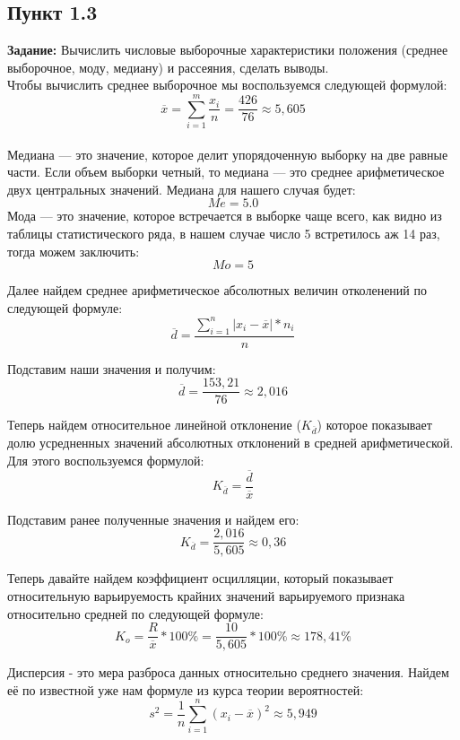 \documentclass[12pt]{article}
\begin{document}
\subsection*{Пункт 1.3}
\textbf{Задание:} Вычислить числовые выборочные характеристики положения (среднее выборочное, моду, медиану) и рассеяния, сделать выводы.\\
\vspace{5mm}
Чтобы вычислить среднее выборочное мы воспользуемся следующей формулой:\\
$$\overline{x} = \sum_{i=1} ^ m \frac{x_i}{n} = \frac{426}{76} \approx 5,605$$
\vspace{5mm}\\
Медиана — это значение, которое делит упорядоченную выборку на две равные части. Если объем выборки четный, то медиана — это среднее арифметическое двух центральных значений. Медиана для нашего случая будет:\\
$$Me = 5.0$$
Мода — это значение, которое встречается в выборке чаще всего, как видно из таблицы статистического ряда, в нашем случае число 5 встретилось аж 14 раз, тогда можем заключить:\\
$$Mo = 5$$

Далее найдем среднее арифметическое абсолютных величин отколенений по следующей формуле:
$$ \overline{d} = \frac{\sum_{i=1}^n |x_i - \overline{x}| * n_i}{n} $$

Подставим наши значения и получим:
$$ \overline{d} = \frac{153,21}{76} \approx 2,016 $$

Теперь найдем относительное линейной отклонение ($K_{\overline{d}}$) которое показывает долю усредненных значений абсолютных отклонений в средней арифметической.\\
Для этого воспользуемся формулой:
$$ K_{\overline{d}} = \frac{\overline{d}}{\overline{x}} $$

Подставим ранее полученные значения и найдем его:
$$ K_{\overline{d}} = \frac{2,016}{5,605} \approx 0,36 $$

Теперь давайте найдем коэффициент осцилляции, который показывает относительную варьируемость крайних значений варьируемого признака относительно средней по следующей формуле:
$$ K_o = \frac{R}{\overline{x}} * 100\% = \frac{10}{5,605} * 100\% \approx 178,41\% $$

Дисперсия - это мера разброса данных относительно среднего значения. Найдем её по известной уже нам формуле из курса теории вероятностей:\\
$$ s^2 = \frac{1}{n} \sum_{i=1} ^n {(x_i - \overline{x})}^2 \approx 5,949 $$
\end{document}
